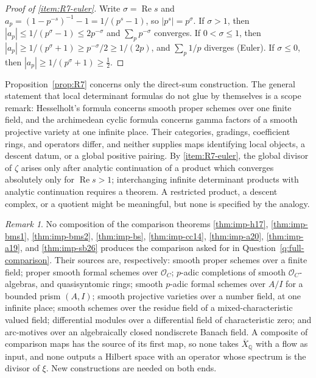 \documentclass[11pt]{amsart}
\theoremstyle{plain}
\theoremstyle{definition}
\theoremstyle{remark}
\newtheorem{remark}[theorem]{Remark}
\numberwithin{equation}{section}
\newcommand{\Q}{\mathbb{Q}}
\newcommand{\Xbar}{\overline{X}}
\newcommand{\cO}{\mathcal{O}}
\DeclareMathOperator{\Rea}{Re}
\renewcommand{\Re}{\Rea}
\begin{document}
\begin{proof}[Proof of \ref{item:R7-euler}]
Write $\sigma=\Re s$ and $a_p=(1-p^{-s})^{-1}-1=1/(p^s-1)$, so
$|p^s|=p^\sigma$. If $\sigma>1$, then
$|a_p|\le1/(p^\sigma-1)\le2p^{-\sigma}$ and $\sum_pp^{-\sigma}$
converges. If $0<\sigma\le1$, then $|a_p|\ge1/(p^\sigma+1)\ge
p^{-\sigma}/2\ge1/(2p)$, and $\sum_p1/p$ diverges (Euler). If
$\sigma\le0$, then $|a_p|\ge1/(p^\sigma+1)\ge\tfrac12$.
\end{proof}

Proposition~\ref{prop:R7} concerns only the direct-sum construction. The
general statement that local determinant formulas do not glue by
themselves is a scope remark: Hesselholt's formula
\cite[Theorem~A]{Hesselholt2016THHZeta} concerns smooth proper schemes
over one finite field, and the archimedean cyclic formula
\cite[Theorem~1.1]{ConnesConsani2014CyclicSerre} concerns gamma factors
of a smooth projective variety at one infinite place. Their categories,
gradings, coefficient rings, and operators differ, and neither supplies
maps identifying local objects, a descent datum, or a global positive
pairing. By \ref{item:R7-euler}, the global divisor of $\zeta$ arises
only after analytic continuation of a product which converges absolutely
only for $\Re s>1$; interchanging infinite determinant products with
analytic continuation requires a theorem. A restricted product, a
descent complex, or a quotient might be meaningful, but none is specified
by the analogy.

\begin{remark}\label{rem:N-composition}
No composition of the comparison theorems
\ref{thm:imp-h17}, \ref{thm:imp-bms1}, \ref{thm:imp-bms2},
\ref{thm:imp-bs}, \ref{thm:imp-cc14}, \ref{thm:imp-a20},
\ref{thm:imp-a19}, and \ref{thm:imp-sb26} produces the comparison asked
for in Question~\ref{q:full-comparison}. Their sources are,
respectively: smooth proper schemes over a finite field; proper smooth
formal schemes over $\cO_C$; $p$-adic completions of smooth
$\cO_C$-algebras, and quasisyntomic rings; smooth $p$-adic formal
schemes over $A/I$ for a bounded prism $(A,I)$; smooth projective
varieties over a number field, at one infinite place; smooth schemes
over the residue field of a mixed-characteristic valued field;
differential modules over a differential field of characteristic zero;
and arc-motives over an algebraically closed nondiscrete Banach field.
A
composite of comparison maps has the source of its first map, so none
takes $\Xbar_\Q$ with a flow as input, and none outputs a Hilbert space
with an operator whose spectrum is the divisor of $\xi$. New
constructions are needed on both ends.
\end{remark}
\end{document}
